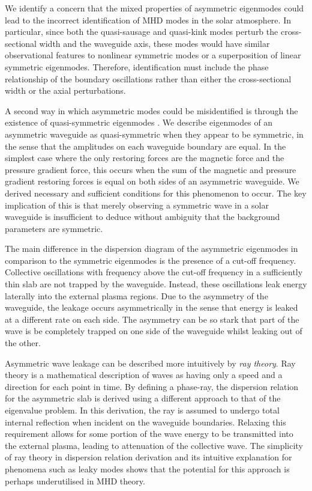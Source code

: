 We identify a concern that the mixed properties of asymmetric eigenmodes could lead to the incorrect identification of MHD modes in the solar atmosphere. In particular, since both the quasi-sausage and quasi-kink modes perturb the cross-sectional width and the waveguide axis, these modes would have similar observational features to nonlinear symmetric modes or a superposition of linear symmetric eigenmodes. Therefore, identification must include the phase relationship of the boundary oscillations rather than either the cross-sectional width or the axial perturbations.

A second way in which asymmetric modes could be misidentified is through the existence of quasi-symmetric eigenmodes \citep{zsa_etal18}. We describe eigenmodes of an asymmetric waveguide as quasi-symmetric when they appear to be symmetric, in the sense that the amplitudes on each waveguide boundary are equal. In the simplest case where the only restoring forces are the magnetic force and the pressure gradient force, this occurs when the sum of the magnetic and pressure gradient restoring forces is equal on both sides of an asymmetric waveguide. We derived necessary and sufficient conditions for this phenomenon to occur. The key implication of this is that merely observing a symmetric wave in a solar waveguide is insufficient to deduce without ambiguity that the background parameters are symmetric.

The main difference in the dispersion diagram of the asymmetric eigenmodes in comparison to the symmetric eigenmodes is the presence of a cut-off frequency. Collective oscillations with frequency above the cut-off frequency in a sufficiently thin slab are not trapped by the waveguide. Instead, these oscillations leak energy laterally into the external plasma regions. Due to the asymmetry of the waveguide, the leakage occurs asymmetrically in the sense that energy is leaked at a different rate on each side. The asymmetry can be so stark that part of the wave is be completely trapped on one side of the waveguide whilst leaking out of the other.

Asymmetric wave leakage can be described more intuitively by \textit{ray theory}. Ray theory is a mathematical description of waves as having only a speed and a direction for each point in time. By defining a phase-ray, the dispersion relation for the asymmetric slab is derived using a different approach to that of the eigenvalue problem. In this derivation, the ray is assumed to undergo total internal reflection when incident on the waveguide boundaries. Relaxing this requirement allows for some portion of the wave energy to be transmitted into the external plasma, leading to attenuation of the collective wave. The simplicity of ray theory in dispersion relation derivation and its intuitive explanation for phenomena such as leaky modes shows that the potential for this approach is perhaps underutilised in MHD theory.

